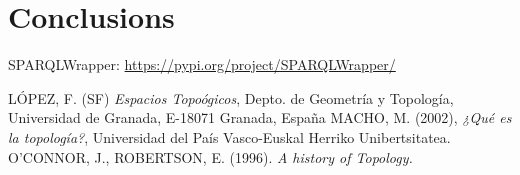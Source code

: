 \documentclass[12pt, twoside]{article}
\begin{document}
\newpage
\section{Conclusions}
\lipsum[5] %
\lipsum[1] %

\newpage


\begin{thebibliography}{X} %
	SPARQLWrapper: \href{https://pypi.org/project/SPARQLWrapper/}{https://pypi.org/project/SPARQLWrapper/}

 LÓPEZ, F. (SF) \textit{Espacios Topoógicos}, Depto. de Geometría y Topología, Universidad de Granada, E-18071 Granada, España
 MACHO, M. (2002), \textit{¿Qué es la topología?}, Universidad del País Vasco-Euskal Herriko Unibertsitatea.
 O’CONNOR, J., ROBERTSON, E. (1996). \textit{A history of Topology.}
\end{thebibliography}
\end{document}
